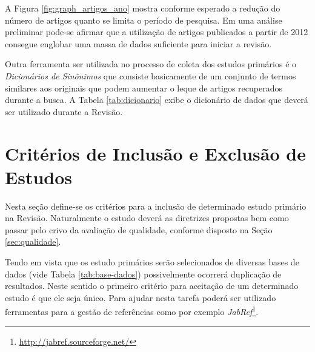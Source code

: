 \documentclass{article}
\begin{document}
A Figura \ref{fig:graph_artigos_ano} mostra conforme esperado a
redução do número de artigos quanto se limita o período de
pesquisa. Em uma análise preliminar pode-se afirmar que a utilização
de artigos publicados a partir de 2012 consegue englobar uma massa de
dados suficiente para iniciar a revisão.

Outra ferramenta ser utilizada no processo de coleta dos estudos primários é o
\textit{Dicionários de Sinônimos} que consiste basicamente de um conjunto de
termos similares aos originais que podem aumentar o leque de artigos
recuperados durante a busca. A Tabela \ref{tab:dicionario} exibe o dicionário de dados que deverá ser utilizado durante a Revisão.

\begin{table}[ht]
\centering
{}
\caption{Dicionário de Sinônimos}
\label{tab:dicionario}
\end{table}


\section{Critérios de Inclusão e Exclusão de Estudos}
\label{sec:criterios_in_out}
Nesta seção define-se os critérios para a inclusão de determinado estudo
primário na Revisão. Naturalmente o estudo deverá as diretrizes propostas bem
como passar pelo crivo da avaliação de qualidade, conforme disposto na Seção
\ref{sec:qualidade}.

Tendo em vista que os estudo primários serão selecionados de diversas bases de
dados (vide Tabela \ref{tab:base-dados}) possivelmente ocorrerá duplicação de
resultados. Neste sentido o primeiro critério para aceitação de um determinado
estudo é que ele seja único. Para ajudar nesta tarefa poderá ser utilizado
ferramentas para a gestão de referências como por exemplo
\textit{JabRef}\footnote{\url{http://jabref.sourceforge.net/}}.
\end{document}
